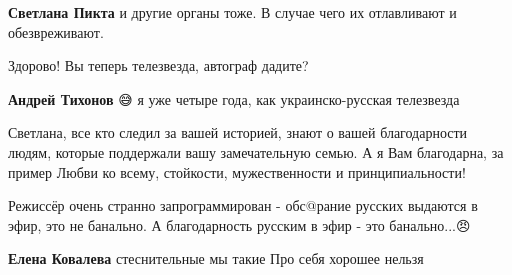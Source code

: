 \begin{itemize}
\begin{itemize}
\textbf{Светлана Пикта} и другие органы тоже. В случае чего их отлавливают и обезвреживают.
\end{itemize}

 
Здорово! Вы теперь телезвезда, автограф дадите?

\begin{itemize}
 
\textbf{Андрей Тихонов} 😅 я уже четыре года, как украинско-русская телезвезда😬
\end{itemize}

 

Светлана, все кто следил за вашей историей, знают о вашей благодарности людям,
которые поддержали вашу замечательную семью. А я Вам благодарна, за пример
Любви ко всему, стойкости, мужественности и принципиальности!


 

Режиссёр очень странно запрограммирован - обс@рание русских выдаются в эфир,
это не банально. А благодарность русским в эфир - это банально...😠

\begin{itemize}
 
\textbf{Елена Ковалева} стеснительные мы такие
Про себя хорошее нельзя
\end{itemize}


\end{itemize}
